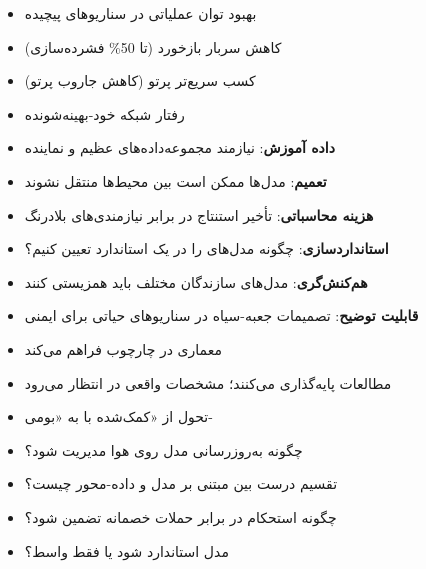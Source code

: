 
\begin{itemize}
\tightlist
\item
  بهبود  توان عملیاتی در سناریوهای پیچیده
\item
  کاهش سربار بازخورد  (تا 50\% فشرده‌سازی)
\item
  کسب سریع‌تر پرتو (کاهش جاروب پرتو)
\item
  رفتار شبکه خود-بهینه‌شونده
\end{itemize}


\begin{itemize}
\tightlist
\item
  \textbf{داده آموزش}: نیازمند مجموعه‌داده‌های عظیم و نماینده
\item
  \textbf{تعمیم}: مدل‌ها ممکن است بین محیط‌ها منتقل نشوند
\item
  \textbf{هزینه محاسباتی}: تأخیر استنتاج در برابر نیازمندی‌های بلادرنگ
\item
  \textbf{استانداردسازی}: چگونه مدل‌های  را در یک استاندارد تعیین کنیم؟
\item
  \textbf{هم‌کنش‌گری}: مدل‌های سازندگان مختلف باید همزیستی کنند
\item
  \textbf{قابلیت توضیح}: تصمیمات جعبه-سیاه در سناریوهای حیاتی برای ایمنی
\end{itemize}


\begin{itemize}
\tightlist
\item
  معماری  در  چارچوب  فراهم می‌کند 
\item
  مطالعات  پایه‌گذاری می‌کنند؛ مشخصات واقعی در  انتظار می‌رود
\item
  تحول از «کمک‌شده با  به «بومی-
\end{itemize}


\begin{itemize}
\tightlist
\item
  چگونه به‌روزرسانی مدل روی هوا مدیریت شود؟
\item
  تقسیم درست بین مبتنی بر مدل و داده-محور چیست؟
\item
  چگونه استحکام در برابر حملات خصمانه تضمین شود؟
\item
  مدل استاندارد شود یا فقط واسط؟
\end{itemize}


